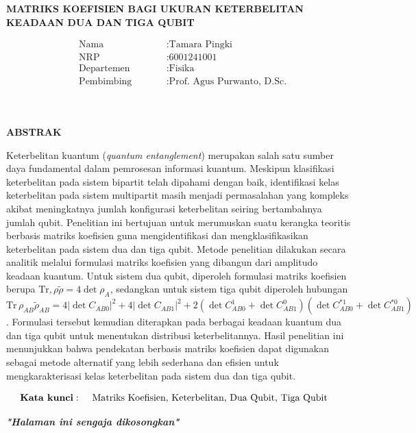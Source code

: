 \begin{center}
	\large{\textbf{MATRIKS KOEFISIEN BAGI UKURAN KETERBELITAN KEADAAN DUA DAN TIGA QUBIT}}
\end{center}
\begin{minipage}{4cm}
	\begin{align*}
		&\text{Nama} \qquad &&: \text{Tamara Pingki} \\
		&\text{NRP} \qquad &&: \text{6001241001} \\
		&\text{Departemen} \qquad &&: \text{Fisika} \\
		&\text{Pembimbing} \qquad &&: \text{Prof. Agus Purwanto, D.Sc.} \\
	\end{align*}
\end{minipage} \\
\begin{center}
	\large\textbf{ABSTRAK} \\  
\end{center}
Keterbelitan kuantum (\textit{quantum entanglement}) merupakan salah satu sumber daya fundamental dalam pemrosesan informasi kuantum. Meskipun klasifikasi keterbelitan pada sistem bipartit telah dipahami dengan baik, identifikasi kelas keterbelitan pada sistem multipartit masih menjadi permasalahan yang kompleks akibat meningkatnya jumlah konfigurasi keterbelitan seiring bertambahnya jumlah qubit. Penelitian ini bertujuan untuk merumuskan suatu kerangka teoritis berbasis matriks koefisien guna mengidentifikasi dan mengklasifikasikan keterbelitan pada sistem dua dan tiga qubit. Metode penelitian dilakukan secara analitik melalui formulasi matriks koefisien yang dibangun dari amplitudo keadaan kuantum. Untuk sistem dua qubit, diperoleh formulasi matriks koefisien berupa $\mathrm{Tr},\rho \tilde{\rho} = 4 \det \rho_A$, sedangkan untuk sistem tiga qubit diperoleh hubungan $\mathrm{Tr}\,\rho_{AB} \tilde{\rho}_{AB}= 4 |\det C_{AB0}|^2 + 4 |\det C_{AB1}|^2 + 2 (\det C_{AB0}^1 + \det C_{AB1}^0)(\det C^{*1}_{AB0} + \det C^{*0}_{AB1})$. Formulasi tersebut kemudian diterapkan pada berbagai keadaan kuantum dua dan tiga qubit untuk menentukan distribusi keterbelitannya. Hasil penelitian ini menunjukkan bahwa pendekatan berbasis matriks koefisien dapat digunakan sebagai metode alternatif yang lebih sederhana dan efisien untuk mengkarakterisasi kelas keterbelitan pada sistem dua dan tiga qubit.

\noindent
\begin{minipage}{1cm}
	\begin{align*}
		\text{\textbf{Kata kunci}}:\hspace{5mm}&\text{Matriks Koefisien, Keterbelitan, Dua Qubit, Tiga Qubit}%
	\end{align*}
\end{minipage}

\newpage
\thispagestyle{empty}
\begin{center}
	\vspace*{\fill}
	\textit{\textbf{"Halaman ini sengaja dikosongkan"}}
	\vspace*{\fill}
\end{center}
\pagebreak
